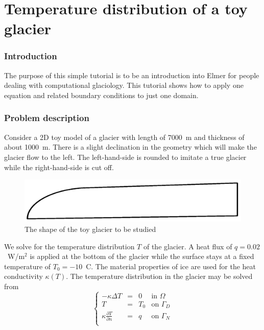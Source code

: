 \chapter{Temperature distribution of a toy glacier}



\subsection*{Introduction}

The purpose of this simple tutorial is to be an introduction into Elmer for people dealing with computational glaciology.
This tutorial shows how to apply one equation and related boundary conditions to just one domain.


\subsection*{Problem description}

Consider a 2D toy model of a glacier with length of 7000~m and thickness of about 1000~m. 
There is a slight declination in the geometry which will make the glacier flow to the left. 
The left-hand-side is rounded to imitate a true glacier while the right-hand-side is cut off. 

\begin{figure}
\begin{center}
\includegraphics[width=120mm]{glacier_toy_shape}
\caption{The shape of the toy glacier to be studied}\label{glac:shape}
\end{center}
\end{figure}

We solve for the temperature distribution $T$ of the glacier. 
A heat flux of $q=0.02$~W/m$^2$ is applied at the bottom of the glacier while the surface stays at a
fixed temperature of $T_0=-10$~C. The material properties of ice are used for the 
heat conductivity $\kappa(T)$. 
The temperature distribution in the glacier may be solved from
\begin{equation}
\left \{
\begin{array}{cccc}
- \kappa \Delta T &= & 0 & \mathrm{ in } \, \, \Omega \\
T&=&T_0 & \mathrm{ on } \, \, \Gamma_D \\
\kappa \frac{\partial T}{\partial n} &=& q & \mathrm{ on } \,\, \Gamma_N \\
\end{array}
\right .
\end{equation}

